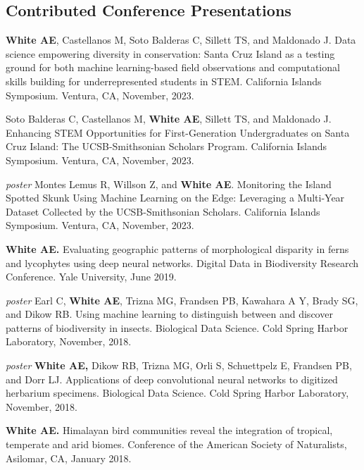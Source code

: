 \documentclass[letterpaper]{article}
\newenvironment{biblist}{%
   \begin{list}{}{%
     \setlength{\labelwidth}{0pt}%
     \setlength{\labelsep}{1em}%
     \setlength{\leftmargin}{2em}%
     \setlength{\itemindent}{-1em}%
   }
}{\end{list}}
\begin{document}
\subsection*{Contributed Conference Presentations}
\begin{biblist}
\item \textbf{White AE}, Castellanos M, Soto Balderas C, Sillett TS, and Maldonado J. Data science empowering diversity in conservation: Santa Cruz Island as a testing ground for both machine learning-based field observations and computational skills building for underrepresented students in STEM. California Islands Symposium. Ventura, CA, November, 2023.

\item Soto Balderas C, Castellanos M, \textbf{White AE}, Sillett TS, and Maldonado J. Enhancing STEM Opportunities for First-Generation Undergraduates on Santa Cruz Island: The UCSB-Smithsonian Scholars Program. California Islands Symposium. Ventura, CA, November, 2023.

\item \emph{poster} Montes Lemus R, Willson Z, and \textbf{White AE}. Monitoring the Island Spotted Skunk Using Machine Learning on the Edge: Leveraging a Multi-Year Dataset Collected by the UCSB-Smithsonian Scholars. California Islands Symposium. Ventura, CA, November, 2023.

\item \textbf{White AE.} Evaluating geographic patterns of morphological disparity in ferns and lycophytes using deep neural networks. Digital Data in Biodiversity Research Conference. Yale University, June 2019.

\item \emph{poster} Earl C, \textbf{White AE}, Trizna MG, Frandsen PB, Kawahara A Y, Brady SG, and Dikow RB. Using machine learning to distinguish between and discover patterns of biodiversity in insects. Biological Data Science. Cold Spring Harbor Laboratory, November, 2018.

\item \emph{poster} \textbf{White AE,} Dikow RB, Trizna MG, Orli S, Schuettpelz E, Frandsen PB, and Dorr LJ. Applications of deep convolutional neural networks to digitized herbarium specimens. Biological Data Science. Cold Spring Harbor Laboratory, November, 2018.

\item \textbf{White AE.} Himalayan bird communities reveal the integration of tropical, temperate and arid biomes. Conference of the American Society of Naturalists, Asilomar, CA, January 2018.


\end{biblist}
\end{document}
